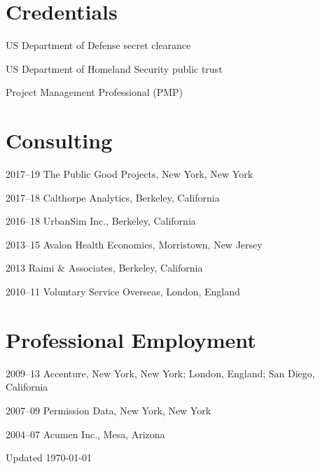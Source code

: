 \documentclass[11pt,a4paper]{report} %
\newcommand{\listitemspace}{0.25em}
\renewenvironment{itemize}
{
  \begin{list}{}{\setlength{\leftmargin}{0em}
      \setlength{\parskip}{0em}
      \setlength{\itemsep}{\listitemspace}
  \setlength{\parsep}{\listitemspace}}}
  {
\end{list}}
\begin{document}
\section*{Credentials}

\begin{itemize}

  \item US Department of Defense secret clearance
  \item US Department of Homeland Security public trust
  \item Project Management Professional (PMP)

\end{itemize}

\section*{Consulting}

\begin{tablist}

\item[2017--19] \tab{}The Public Good Projects, New York, New York
\item[2017--18] \tab{}Calthorpe Analytics, Berkeley, California
\item[2016--18] \tab{}UrbanSim Inc., Berkeley, California
\item[2013--15] \tab{}Avalon Health Economics, Morristown, New Jersey
\item[2013]     \tab{}Raimi \& Associates, Berkeley, California
\item[2010--11] \tab{}Voluntary Service Overseas, London, England

\end{tablist}

\section*{Professional Employment}

\begin{tablist}

\item[2009--13] \tab{}Accenture, New York, New York; London, England; San Diego, California
\item[2007--09] \tab{}Permission Data, New York, New York
\item[2004--07] \tab{}Acumen Inc., Mesa, Arizona

\end{tablist}

\begin{center}
  \vfill
  Updated \monthyeardate\today
\end{center}
\end{document}

